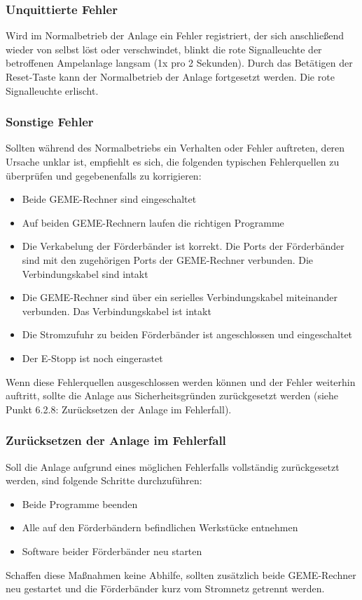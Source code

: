 \documentclass[oneside,a4paper,titlepage]{scrartcl} %
\begin{document}
\subsubsection{Unquittierte Fehler}
Wird im Normalbetrieb der Anlage ein Fehler registriert, der sich anschließend wieder von selbst löst oder verschwindet, blinkt die rote Signalleuchte der betroffenen Ampelanlage langsam (1x pro 2 Sekunden). Durch das Betätigen der Reset-Taste kann der Normalbetrieb der Anlage fortgesetzt werden. Die rote Signalleuchte erlischt.

\subsubsection{Sonstige Fehler}
Sollten während des Normalbetriebs ein Verhalten oder Fehler auftreten, deren Ursache unklar ist, empfiehlt es sich, die folgenden typischen Fehlerquellen zu überprüfen und gegebenenfalls zu korrigieren:
\begin{itemize}
    \item Beide GEME-Rechner sind eingeschaltet
    \item Auf beiden GEME-Rechnern laufen die richtigen Programme
    \item Die Verkabelung der Förderbänder ist korrekt. Die Ports der Förderbänder sind mit den zugehörigen Ports der GEME-Rechner verbunden. Die Verbindungskabel sind intakt
    \item Die GEME-Rechner sind über ein serielles Verbindungskabel miteinander verbunden. Das Verbindungskabel ist intakt
    \item Die Stromzufuhr zu beiden Förderbänder ist angeschlossen und eingeschaltet
    \item Der E-Stopp ist noch eingerastet
\end{itemize}
Wenn diese Fehlerquellen ausgeschlossen werden können und der Fehler weiterhin auftritt, sollte die Anlage aus Sicherheitsgründen zurückgesetzt werden (siehe Punkt 6.2.8: Zurücksetzen der Anlage im Fehlerfall).

\subsubsection{Zurücksetzen der Anlage im Fehlerfall}
Soll die Anlage aufgrund eines möglichen Fehlerfalls vollständig zurückgesetzt werden, sind folgende Schritte durchzuführen:
\begin{itemize}
  \item Beide Programme beenden
  \item Alle auf den Förderbändern befindlichen Werkstücke entnehmen
  \item Software beider Förderbänder neu starten  
\end{itemize}
Schaffen diese Maßnahmen keine Abhilfe, sollten zusätzlich beide GEME-Rechner neu gestartet und die Förderbänder kurz vom Stromnetz getrennt werden.
\end{document}

